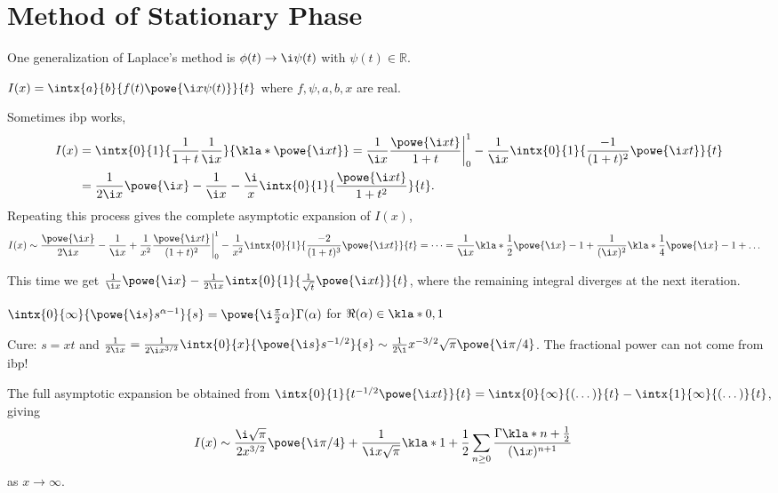 \documentclass[english, parskip=full]{scrbook}
\newcommand{\definition}[2]{\begin{tcolorbox}[colback=colorbackgrounddefinition,colframe=colordefinition, breakable,enhanced,title=\textbf{#1}.]#2\end{tcolorbox}}
\newcommand{\note}[1]{\begin{tcolorbox}[colback=colorbackgroundnote,colframe=colornote, breakable,enhanced]#1\end{tcolorbox}}
\newcommand{\example}[3]{\begin{tcolorbox}[colback=colorbackgroundexample,colframe=colorexample, breakable,enhanced,title={\textbf{#1}: #2.}]#3\end{tcolorbox}}
\begin{document}
\section{Method of Stationary Phase}
One generalization of Laplace's method is $\phi(t) \rightarrow\i\psi(t)$ with $\psi(t)\in\mathbb{R}$.
\definition{Generalized Fourier Integral}{$I(x) = \intx{a}{b}{f(t) \powe{\i x\psi(t)}}{t}$ where $f,\psi,a,b,x$ are real.}
\example{Integration by Parts}{$I(x) = \intx{0}{1}{\frac{\powe{\i xt}}{1+t}}{t}$}{Sometimes \gls{ibp} works,
\begin{align}
I(x) &= \intx{0}{1}{\frac{1}{1+t} \frac{1}{\i x}}{\kla*{\powe{\i xt}}} = \frac{1}{\i x} \frac{\powe{\i xt}}{1+t}\bigg\vert_0^1 - \frac{1}{\i x} \intx{0}{1}{\frac{-1}{(1+t)^2} \powe{\i xt}}{t}\\
&= \frac{1}{2\i x} \powe{\i x} - \frac{1}{\i x} - \frac{\i}{x} \intx{0}{1}{\frac{\powe{\i xt}}{1 + t^2}}{t}.
\end{align}
Repeating this process gives the complete asymptotic expansion of $I(x)$,
\begin{align}
I(x) &\sim \frac{\powe{\i x}}{2\i x} - \frac{1}{\i x} + \frac{1}{x^2} \frac{\powe{\i xt}}{(1+t)^2} \bigg\vert_0^1 - \frac{1}{x^2} \intx{0}{1}{\frac{-2}{(1+t)^3} \powe{\i xt}}{t} = \dots = \frac{1}{\i x} \kla*{\frac{1}{2} \powe{\i x} - 1} + \frac{1}{(\i x)^2} \kla*{\frac{1}{4} \powe{\i x} - 1} + \dots
\end{align}
}
\example{\gls{ibp} fails}{$I(x) = \intx{0}{1}{\sqrt{t} \powe{\i xt}}{t}$}{This time we get $\frac{1}{\i x} \powe{\i x} - \frac{1}{2\i x} \intx{0}{1}{\frac{1}{\sqrt{t}} \powe{\i xt}}{t}$, where the remaining integral diverges at the next iteration.
\note{$\intx{0}{\infty}{\powe{\i s} s^{\alpha - 1}}{s} = \powe{\i \frac{\pi}{2}\alpha} \Gamma(\alpha)$ for $\Re(\alpha) \in \kla*{0,1}$}
Cure: $s=xt$ and $\frac{1}{2\i x} = \frac{1}{2\i x^{3/2}} \intx{0}{x}{\powe{\i s} s^{-1/2}}{s} \sim \frac{1}{2\i} x^{-3/2} \sqrt{\pi} \powe{\i \pi/4}$.
The fractional power can not come from \gls{ibp}!

The full asymptotic expansion be obtained from $\intx{0}{1}{t^{-1/2} \powe{\i xt}}{t} = \intx{0}{\infty}{(\dots)}{t} - \intx{1}{\infty}{(\dots)}{t}$, giving
\begin{align}
I(x) &\sim \frac{\i \sqrt{\pi}}{2x^{3/2}} \powe{\i\pi /4} + \frac{1}{\i x\sqrt{\pi}} \kla*{1 + \frac{1}{2} \sum_{n\ge 0} \frac{\Gamma\kla*{n + \frac{1}{2}}}{(\i x)^{n+1}}}
\end{align}
as $x\rightarrow\infty$.
}
\end{document}
